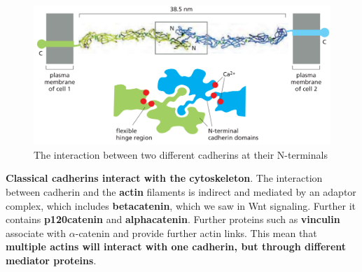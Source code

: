 \documentclass[../main.tex]{subfiles}
\begin{document}
\begin{figure}[H]
	\centering
	\includegraphics[width=0.6\linewidth]{cad_nter}
	\caption{The interaction between two different cadherins at their N-terminals}
	\label{fig:cadnter}
\end{figure}
\begin{figure}[H]
	\centering
	\hfill
	\caption{}
	\label{fig:cadCaInt}
\end{figure}

\textbf{Classical cadherins interact with the cytoskeleton}. The interaction between cadherin and the \textbf{\gls{actin}} filaments is indirect and mediated by an adaptor complex, which includes \textbf
{\gls{betacatenin}}, which we saw in Wnt signaling. Further it contains \textbf{\gls{p120catenin}} and \textbf{\gls{alphacatenin}}. Further proteins such as \textbf{\gls{vinculin}} associate with $\alpha$-catenin and provide further actin links. This mean that \textbf{multiple actins will interact with one cadherin, but through different mediator proteins}. \\
\end{document}
